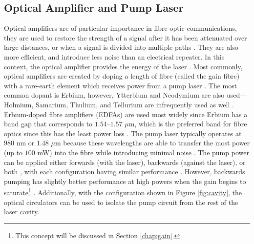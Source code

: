 \subsection{Optical Amplifier and Pump Laser}
Optical amplifiers are of particular importance in fibre optic communications, they are used to restore the strength of a signal after it has been attenuated over large distances, or when a signal is divided into multiple paths \cite{alazzawi, starodoumov}. They are also more efficient, and introduce less noise than an electrical repeater. In this context, the optical amplifier provides the energy of the laser \cite{alazzawi}. Most commonly, optical amplifiers are created by doping a length of fibre (called the gain fibre) with a rare-earth element which receives power from a pump laser \cite{agrawal2002, alazzawi, starodoumov}. The most common dopant is Erbium, however, Ytterbium and Neodymium are also used---Holmium, Samarium, Thulium, and Tellurium are infrequently used as well \cite{agrawal2002}. \\

Erbium-doped fibre amplifiers (EDFAs) are used most widely since Erbium has a band gap that corresponds to $1.54$--$1.57$ $\mu$m, which is the preferred band for fibre optics since this has the least power loss \cite{agrawal2002, alazzawi, starodoumov}. The pump laser typically operates at $980$ nm or $1.48$ $\mu$m because these wavelengths are able to transfer the most power (up to $100$ mW) into the fibre while introducing minimal noise \cite{agrawal2002, alazzawi, becker, starodoumov}. The pump power can be applied either forwards (with the laser), backwards (against the laser), or both \cite{alazzawi}, with each configuration having similar performance \cite{agrawal2002}. However, backwards pumping has slightly better performance at high powers when the gain begins to saturate\footnote{This concept will be discussed in Section \ref{chap:gain}.} \cite{agrawal2002}. Additionally, with the configuration shown in Figure \ref{fig:cavity}, the optical circulators can be used to isolate the pump circuit from the rest of the laser cavity. \\

